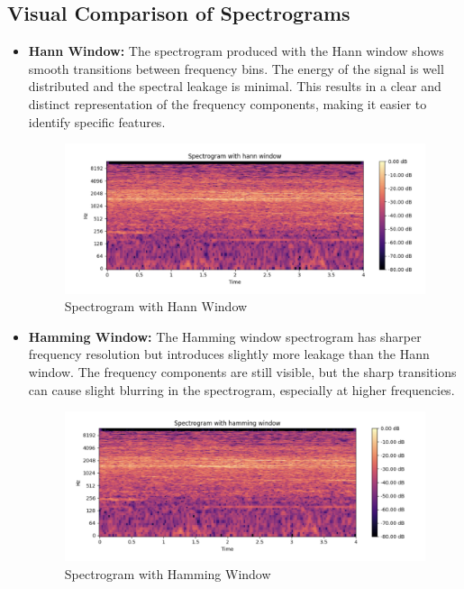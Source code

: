 \documentclass[a4paper,12pt]{article}
\begin{document}
\subsection{Visual Comparison of Spectrograms}
\begin{itemize}
\item \textbf{Hann Window:} The spectrogram produced with the Hann window shows smooth transitions between frequency bins. The energy of the signal is well distributed and the spectral leakage is minimal. This results in a clear and distinct representation of the frequency components, making it easier to identify specific features.

\begin{figure}[H]
    \centering
    \includegraphics[width=1\linewidth]{HannWindow.png}
    \caption{Spectrogram with Hann Window}
    \label{fig:enter-label}
\end{figure}

\item \textbf{Hamming Window:} The Hamming window spectrogram has sharper frequency resolution but introduces slightly more leakage than the Hann window. The frequency components are still visible, but the sharp transitions can cause slight blurring in the spectrogram, especially at higher frequencies.

\begin{figure}[H]
    \centering
    \includegraphics[width=1\linewidth]{HammingWindow.png}
    \caption{Spectrogram with Hamming Window}
    \label{fig:enter-label}
\end{figure}


\end{itemize}
\end{document}
